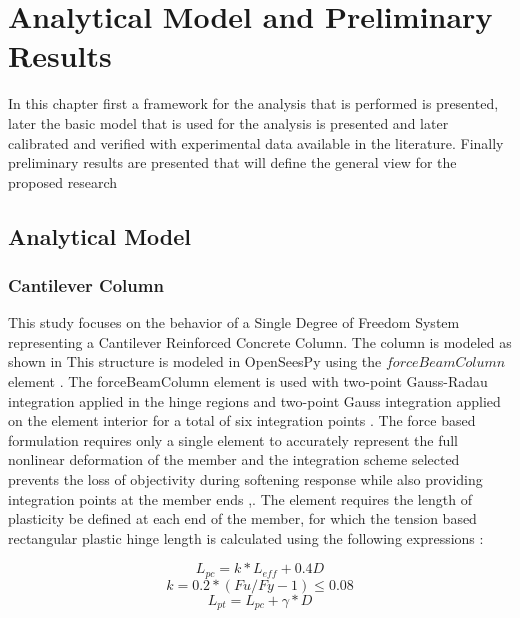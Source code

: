 \chapter{Analytical Model and Preliminary Results}
In this chapter first a framework for the analysis that is performed is presented, later the basic model that is used for the analysis is presented and later calibrated and verified with experimental data available in the literature. Finally preliminary results are presented that will define the general view for the proposed research

\section{Analytical Model}

\subsection{Cantilever Column}
This study focuses on the behavior of a Single Degree of Freedom System representing a Cantilever Reinforced Concrete Column. The column is modeled as shown in  This structure is modeled in OpenSeesPy \cite{McKenna2010}\cite{Zhu2018} using the $forceBeamColumn$ element \cite{Scott}. The forceBeamColumn element is used with two-point Gauss-Radau integration applied in the hinge regions and two-point Gauss integration applied on the element interior for a total of six integration points \cite{Scott}. The force based formulation requires only a single element to accurately represent the full nonlinear deformation of the member and the integration scheme selected prevents the loss of objectivity during softening response while also providing integration points at the member ends \cite{Calabrese2010},\cite{Scott}. The element requires the length of plasticity be defined at each end of the member, for which the tension based rectangular plastic hinge length is calculated using the following expressions \cite{Goodnight2013}:

\begin{equation}
    L_{pc}=k*L_{eff} + 0.4D
    \label{eq:LP_Comp}
\end{equation}
\begin{equation}
	k=0.2*(Fu/Fy - 1) \leqslant 0.08
	\label{eq:K_Lp}
\end{equation}
\begin{equation}
    L_{pt}=L_{pc}+\gamma*D
    \label{eq:LP_Tension}
\end{equation}

